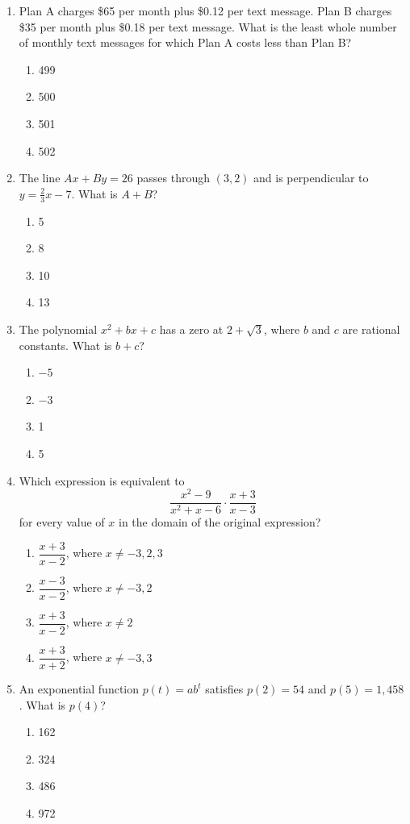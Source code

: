 \documentclass[12pt]{article}
\begin{document}
\begin{enumerate}[leftmargin=*,itemsep=1.15em]
  \item Plan A charges \$65 per month plus \$0.12 per text message. Plan B charges \$35 per month plus \$0.18 per text message. What is the least whole number of monthly text messages for which Plan A costs less than Plan B?
  \begin{enumerate}[label=\Alph*.,itemsep=0pt]
    \item 499 \item 500 \item 501 \item 502
  \end{enumerate}

  \item The line $Ax+By=26$ passes through $(3,2)$ and is perpendicular to $y=\frac23x-7$. What is $A+B$?
  \begin{enumerate}[label=\Alph*.,itemsep=0pt]
    \item 5 \item 8 \item 10 \item 13
  \end{enumerate}

  \item The polynomial $x^2+bx+c$ has a zero at $2+\sqrt3$, where $b$ and $c$ are rational constants. What is $b+c$?
  \begin{enumerate}[label=\Alph*.,itemsep=0pt]
    \item $-5$ \item $-3$ \item 1 \item 5
  \end{enumerate}

  \item Which expression is equivalent to
  \[
    \frac{x^2-9}{x^2+x-6}\cdot\frac{x+3}{x-3}
  \]
  for every value of $x$ in the domain of the original expression?
  \begin{enumerate}[label=\Alph*.,itemsep=0pt]
    \item $\dfrac{x+3}{x-2}$, where $x\ne-3,2,3$
    \item $\dfrac{x-3}{x-2}$, where $x\ne-3,2$
    \item $\dfrac{x+3}{x-2}$, where $x\ne2$
    \item $\dfrac{x+3}{x+2}$, where $x\ne-3,3$
  \end{enumerate}

  \item An exponential function $p(t)=ab^t$ satisfies $p(2)=54$ and $p(5)=1,458$. What is $p(4)$?
  \begin{enumerate}[label=\Alph*.,itemsep=0pt]
    \item 162 \item 324 \item 486 \item 972
  \end{enumerate}


\end{enumerate}
\end{document}
